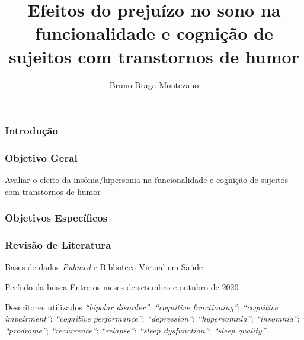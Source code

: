 \documentclass{beamer}
\title{Efeitos do prejuízo no sono na funcionalidade e cognição de sujeitos com transtornos de humor}
\author[Bruno Montezano]{Bruno Braga Montezano}
\institute{Universidade Católica de Pelotas}
\begin{document}
\begin{frame}

\maketitle

\end{frame}

\begin{frame}
\frametitle{Introdução}



\end{frame}

\begin{frame}
    \frametitle{Objetivo Geral}

    \centering
    \Large
    Avaliar o efeito da insônia/hipersonia na funcionalidade e
    cognição de sujeitos com transtornos de humor

\end{frame}

\begin{frame}
    \frametitle{Objetivos Específicos}


    
\end{frame}

\begin{frame}
    \frametitle{Revisão de Literatura}

    \begin{block}{Bases de dados}
        \emph{Pubmed} e Biblioteca Virtual em Saúde
    \end{block}

    \begin{block}{Período da busca}
        Entre os meses de setembro e outubro de 2020
    \end{block}

    \begin{block}{Descritores utilizados}
        \textit{``bipolar disorder''};
        \textit{``cognitive functioning''}; \textit{``cognitive impairment''};
        \textit{``cognitive performance''}; \textit{``depression''};
        \textit{``hypersomnia''}; \textit{``insomnia''}; \textit{``prodrome''};
        \textit{``recurrence''}; \textit{``relapse''}; \textit{``sleep dysfunction''};
        \textit{``sleep quality''}
    \end{block}

\end{frame}
\end{document}
